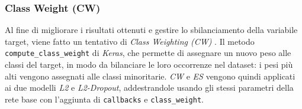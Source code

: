 





\subsubsection{Class Weight (CW)}

Al fine di migliorare i risultati ottenuti e gestire lo sbilanciamento della variabile target, viene fatto un tentativo di \textit{Class Weighting (CW)} \cite{kerasKerasDocumentation}\cite{tensorflowClassificazioneDati}. Il metodo \texttt{compute\_class\_weight} di \textit{Keras}, che permette di assegnare un nuovo peso alle classi del target, in modo da bilanciare le loro occorrenze nel dataset: i pesi più alti vengono assegnati alle classi minoritarie.
\textit{CW} e \textit{ES} vengono quindi applicati ai due modelli \textit{L2} e \textit{L2-Dropout}, addestrandole usando gli stessi parametri
della rete base con l'aggiunta di \texttt{callbacks} e  \texttt{class\_weight}.

